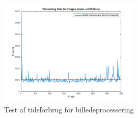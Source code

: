 \begin{figure}[H]
	\centering
	\includegraphics[width=0.6\textwidth]{billeder/software/dataprocessing_2.png}
	\caption{Test af tidsforbrug for billedeprocessering}
	\label{fig:dataprocess}
\end{figure}